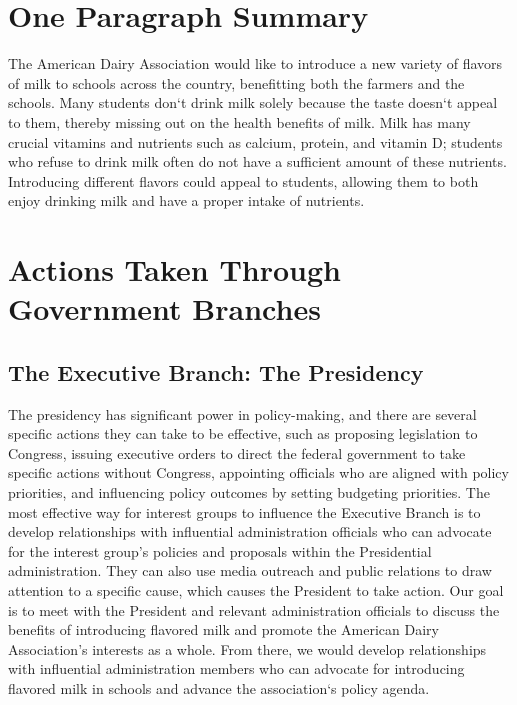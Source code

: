 \documentclass[a4paper, 12pt]{article}
\begin{document}
 
\tableofcontents
\pagebreak
\section{One Paragraph Summary}
\hspace{\parindent} The American Dairy Association would like to introduce a new variety of flavors of milk to schools across the country, benefitting both the farmers and the schools. Many students don`t drink milk solely because the taste doesn`t appeal to them, thereby missing out on the health benefits of milk. Milk has many crucial vitamins and nutrients such as calcium, protein, and vitamin D; students who refuse to drink milk often do not have a sufficient amount of these nutrients. Introducing different flavors could appeal to students, allowing them to both enjoy drinking milk and have a proper intake of nutrients.

\section{Actions Taken Through Government Branches} 
\subsection{The Executive Branch: The Presidency}
\hspace{\parindent} The presidency has significant power in policy-making, and there are several specific actions they can take to be effective, such as proposing legislation to Congress, issuing executive orders to direct the federal government to take specific actions without Congress, appointing officials who are aligned with policy priorities, and influencing policy outcomes by setting budgeting priorities. The most effective way for interest groups to influence the Executive Branch is to develop relationships with influential administration officials who can advocate for the interest group's policies and proposals within the Presidential administration. They can also use media outreach and public relations to draw attention to a specific cause, which causes the President to take action. Our goal is to meet with the President and relevant administration officials to discuss the benefits of introducing flavored milk and promote the American Dairy Association's interests as a whole. From there, we would develop relationships with influential administration members who can advocate for introducing flavored milk in schools and advance the association`s policy agenda. 
\end{document}
